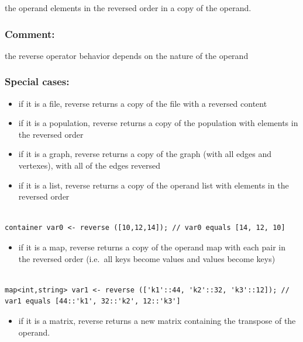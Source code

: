 \documentclass[]{book}
\providecommand{\tightlist}{%
  \setlength{\itemsep}{0pt}\setlength{\parskip}{0pt}}
\theoremstyle{definition}
\theoremstyle{definition}
\theoremstyle{definition}
\theoremstyle{remark}
\begin{document}
the operand elements in the reversed order in a copy of the operand.

\subsubsection{Comment:}\label{comment-83}

the reverse operator behavior depends on the nature of the operand

\subsubsection{Special cases:}\label{special-cases-117}

\begin{itemize}
\tightlist
\item
  if it is a file, reverse returns a copy of the file with a reversed
  content\\
\item
  if it is a population, reverse returns a copy of the population with
  elements in the reversed order\\
\item
  if it is a graph, reverse returns a copy of the graph (with all edges
  and vertexes), with all of the edges reversed\\
\item
  if it is a list, reverse returns a copy of the operand list with
  elements in the reversed order
\end{itemize}

\begin{verbatim}
 
container var0 <- reverse ([10,12,14]); // var0 equals [14, 12, 10]
\end{verbatim}

\begin{itemize}
\tightlist
\item
  if it is a map, reverse returns a copy of the operand map with each
  pair in the reversed order (i.e.~all keys become values and values
  become keys)
\end{itemize}

\begin{verbatim}
 
map<int,string> var1 <- reverse (['k1'::44, 'k2'::32, 'k3'::12]); // var1 equals [44::'k1', 32::'k2', 12::'k3']
\end{verbatim}

\begin{itemize}
\tightlist
\item
  if it is a matrix, reverse returns a new matrix containing the
  transpose of the operand.
\end{itemize}
\end{document}
